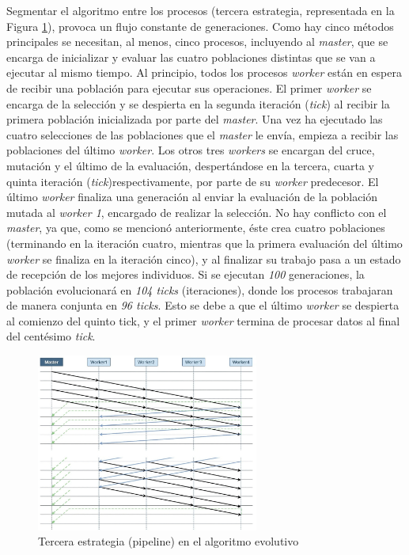 	Segmentar el algoritmo entre los procesos (tercera estrategia, representada en la Figura \ref{fig:pev_mpi3}), provoca un flujo constante de generaciones. Como hay cinco métodos principales se necesitan, al menos, cinco procesos, incluyendo al \textit{master}, que se encarga de inicializar y evaluar las cuatro poblaciones distintas que se van a ejecutar al mismo tiempo. Al principio, todos los procesos \textit{worker} están en espera de recibir una población para ejecutar sus operaciones. El primer \textit{worker} se encarga de la selección y se despierta en la segunda iteración (\textit{tick}) al recibir la primera población inicializada por parte del \textit{master}. Una vez ha ejecutado las cuatro selecciones de las poblaciones que el \textit{master} le envía, empieza a recibir las poblaciones del último \textit{worker}. Los otros tres \textit{workers} se encargan del cruce, mutación y el último de la evaluación, despertándose en la tercera, cuarta y quinta iteración (\textit{tick})respectivamente, por parte de su \textit{worker} predecesor. El último \textit{worker} finaliza una generación al enviar la evaluación de la población mutada al \textit{worker 1}, encargado de realizar la selección. No hay conflicto con el \textit{master}, ya que, como se mencionó anteriormente, éste crea cuatro poblaciones (terminando en la iteración cuatro, mientras que la primera evaluación del último \textit{worker} se finaliza en la iteración cinco), y al finalizar su trabajo pasa a un estado de recepción de los mejores individuos. Si se ejecutan \textit{100} generaciones, la población evolucionará en \textit{104 ticks} (iteraciones), donde los procesos trabajaran de manera conjunta en \textit{96 ticks}. Esto se debe a que el último \textit{worker} se despierta al comienzo del quinto tick, y el primer \textit{worker} termina de procesar datos al final del centésimo \textit{tick}.
	
	
		
	\begin{figure}[!h]
		\centering
		\includegraphics[width=0.65\textwidth]{images/chapter_3/pev_mpi3}
		\caption{Tercera estrategia (pipeline) en el algoritmo evolutivo }
		\label{fig:pev_mpi3}
	\end{figure}

